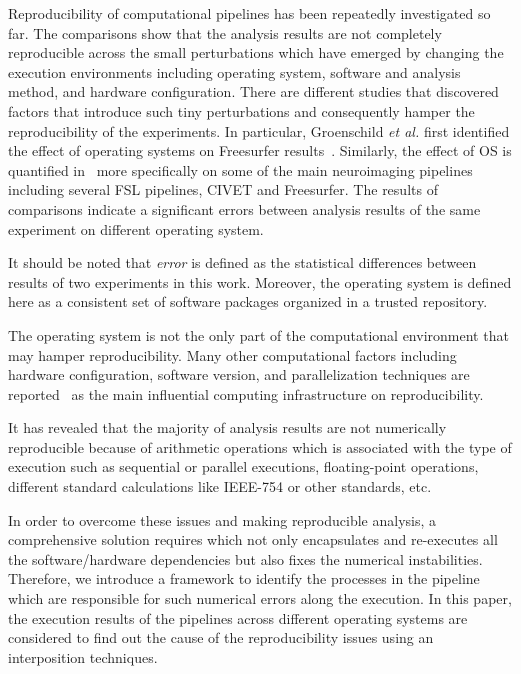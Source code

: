 \documentclass{article}
\begin{document}
{Reproducibility of computational pipelines has been repeatedly 
investigated so far. The comparisons show that the analysis results are 
not completely reproducible across the small perturbations which have 
emerged by changing the execution environments including operating 
system, software and analysis method, and hardware configuration. There 
are different studies that discovered factors that introduce such tiny 
perturbations and consequently hamper the reproducibility of the 
experiments. In particular, Groenschild \emph{et al.} first identified 
the effect of operating systems on Freesurfer 
results~\cite{Gronenschild2012}. Similarly, the effect of OS is 
quantified in~\cite{Glatard2015} more specifically on some 
of the main neuroimaging pipelines including several FSL pipelines, 
CIVET and Freesurfer. The results of comparisons indicate a significant 
errors between analysis results of the same experiment on different 
operating system. 

It should be noted that \emph{error} is defined as the statistical 
differences between results of two experiments in this work. Moreover, 
the operating system is defined here as a consistent set of software 
packages organized in a trusted repository.

The operating system is not the only part of the computational 
environment that may hamper reproducibility. Many other computational 
factors including hardware configuration, software version, and 
parallelization techniques are reported~\cite{diethelm2012limits} as 
the main influential computing infrastructure on reproducibility. 

It has revealed that the majority of analysis results are not 
numerically reproducible because of arithmetic operations which is 
associated with the type of execution such as sequential or parallel 
executions, floating-point operations, different standard calculations 
like IEEE-754 or other standards, etc.

In order to overcome these issues and making reproducible analysis, a 
comprehensive solution requires which not only encapsulates and 
re-executes all the software/hardware dependencies but also fixes the 
numerical instabilities. Therefore, we introduce a framework to 
identify the processes in the pipeline which are responsible for such 
numerical errors along the execution. In this paper, the execution 
results of the pipelines across different operating systems are 
considered to find out the cause of the reproducibility issues using an 
interposition techniques.

}
\end{document}
